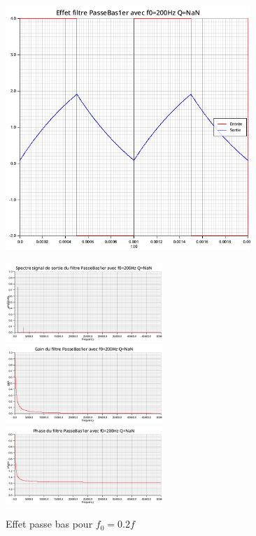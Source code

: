 \documentclass{article}
\begin{document}
\begin{figure}[H]
  \begin{minipage}{0.6\textwidth}
      \centering
      \includegraphics[width=25em]{images/creneau/bas/0.2/signals.png}
  \end{minipage}
  \begin{minipage}{0.3\textwidth}
      \centering
      \includegraphics[width=16em]{images/creneau/bas/0.2/fft_out.png}
      \vfill
      \includegraphics[width=16em]{images/creneau/bas/0.2/gain.png}
      \vfill
      \includegraphics[width=16em]{images/creneau/bas/0.2/phase.png}
  \end{minipage}
  \caption{Effet passe bas pour $f_0=0.2f$}
\end{figure}
\end{document}
